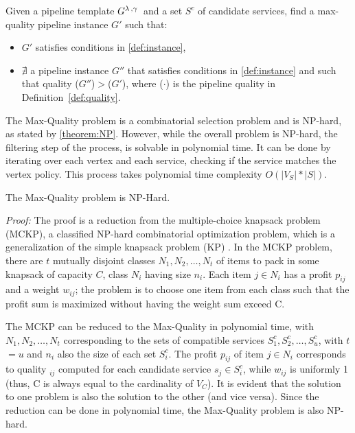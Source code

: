 \begin{definition}\label{def:MaXQualityInstance}
Given a pipeline template $G^{\lambda\,,\gamma\,}$ and a set $S^c$ of candidate services, find a max-quality pipeline instance $G'$ such that:
  \begin{itemize}
    \item $G'$ satisfies conditions in \cref{def:instance},
    \item $\nexists$ a pipeline instance $G''$ that satisfies conditions in \cref{def:instance} and such that quality \q($G''$)$>$\q($G'$), where \q($\cdot$) is the pipeline quality in Definition~\ref{def:quality}.
  \end{itemize}
\end{definition}

\vspace{0.5em}

The Max-Quality problem is a combinatorial selection problem and is NP-hard, as stated by \cref{theorem:NP}. However, while the overall problem is NP-hard, the filtering step of the process, is solvable in polynomial time.
It can be done by iterating over each vertex and each service, checking if the service matches the vertex policy. This process takes polynomial time complexity $O(|V_S|*|S|)$.

\vspace{0.5em}

\begin{theorem}\label{theorem:NP}
  The Max-Quality problem is NP-Hard.
\end{theorem}
\emph{Proof: }
The proof is a reduction from the multiple-choice knapsack problem (MCKP), a classified NP-hard combinatorial optimization problem, which is a generalization of the simple knapsack problem (KP) \cite{Kellerer2004}. In the MCKP problem, there are $t$ mutually disjoint classes $N_1,N_2,\ldots,N_t$ of items to pack in some knapsack of capacity $C$, class $N_i$ having size $n_i$. Each item $j$$\in$$N_i$ has a profit $p_{ij}$ and a weight $w_{ij}$; the problem is to choose one item from each class such that the profit sum is maximized without having the weight sum exceed C.

The MCKP can be reduced to the Max-Quality \problem in polynomial time, with $N_1,N_2,\ldots,N_t$ corresponding to the sets of compatible services $S^c_{1}, S^c_{2}, \ldots, S^c_{u}$, with $t$$=$$u$ and $n_i$ also the size of each set $S^c_{i}$. The profit $p_{ij}$ of item $j$$\in$$N_i$ corresponds to quality \textit{\q}$_{ij}$ computed for each candidate service $s_j$$\in$$S^c_{i}$, while $w_{ij}$ is uniformly 1 (thus, C is always equal to the cardinality of $V_C$). It is evident that the solution to one problem is also the solution to the other (and vice versa). Since the reduction can be done in polynomial time, the Max-Quality problem is also NP-hard.

